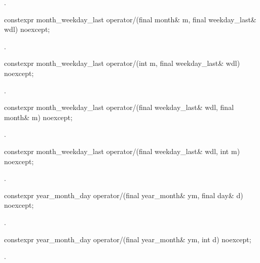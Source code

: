 \begin{itemdescr}
\pnum
\returns {}.
\end{itemdescr}

\begin{itemdecl}
constexpr month_weekday_last
  operator/(final month& m, final weekday_last& wdl) noexcept;
\end{itemdecl}

\begin{itemdescr}
\pnum
\returns {}.
\end{itemdescr}

\begin{itemdecl}
constexpr month_weekday_last
  operator/(int m, final weekday_last& wdl) noexcept;
\end{itemdecl}

\begin{itemdescr}
\pnum
\returns {}.
\end{itemdescr}

\begin{itemdecl}
constexpr month_weekday_last
  operator/(final weekday_last& wdl, final month& m) noexcept;
\end{itemdecl}

\begin{itemdescr}
\pnum
\returns {}.
\end{itemdescr}

\begin{itemdecl}
constexpr month_weekday_last
  operator/(final weekday_last& wdl, int m) noexcept;
\end{itemdecl}

\begin{itemdescr}
\pnum
\returns {}.
\end{itemdescr}

\begin{itemdecl}
constexpr year_month_day
  operator/(final year_month& ym, final day& d) noexcept;
\end{itemdecl}

\begin{itemdescr}
\pnum
\returns {}.
\end{itemdescr}

\begin{itemdecl}
constexpr year_month_day
  operator/(final year_month& ym, int d) noexcept;
\end{itemdecl}

\begin{itemdescr}
\pnum
\returns {}.
\end{itemdescr}

